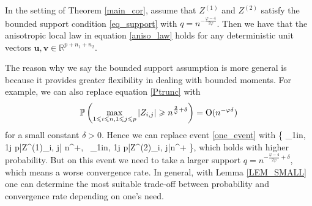 \begin{lemma} \label{LEM_SMALL} %
In the setting of Theorem \ref{main_cor}, assume that $Z^{(1)}$ and $Z^{(2)}$ satisfy the bounded support condition \eqref{eq_support} with $q = n^{-\frac{\varphi - 4}{2\varphi}}$.
Then we have that the anisotropic local law in equation \eqref{aniso_law} holds 
for any deterministic unit vectors $\mathbf u, \mathbf v \in \mathbb R^{p+n_1+n_2}$.
\end{lemma}

\begin{remark}
The reason why we say the bounded support assumption is more general is because it provides greater flexibility in dealing with bounded moments. For example, we can also replace equation \eqref{Ptrunc} with
\begin{align*}
	\mathbb{P}\left(\max_{1\leqslant i\leqslant n, 1\leqslant j \leqslant p}|Z_{i, j}|\geqslant n^{\frac{2}{\varphi}+\delta}\right) = \operatorname{O}(  n^{-\varphi \delta}) 
	\end{align*}
	for a small constant $\delta>0$. Hence we can replace event \eqref{one_event} with 
	\be\nonumber \left\{ \max_{1\le i\le n, 1\le j \le p}|Z^{(1)}_{i, j}| \le n^{+\delta}, \ \max_{1\le i\le n, 1\le j \le p}|Z^{(2)}_{i, j}|\le   n^{+\delta} \right\},\ee
	which holds with higher probability. But on this event we need to take a larger support $q=n^{-\frac{\varphi - 4}{2\varphi}+\delta}$, which means a worse convergence rate. In general, with Lemma \ref{LEM_SMALL} one can determine the most suitable trade-off between probability and convergence rate depending on one's need.
\end{remark}

